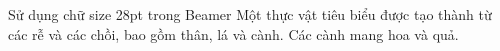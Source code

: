 \documentclass[28pt]{beamer}
\begin{document}
\begin{frame}{Sử dụng chữ size 28pt trong Beamer}
  \justifying
  Một thực vật tiêu biểu được tạo thành từ các rễ và các chồi, bao gồm thân, lá và cành. Các cành mang hoa và quả.
\end{frame}
\end{document}
